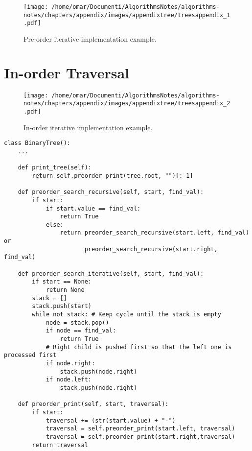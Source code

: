 \begin{figure}[H]
	\begin{center}
		\texttt{[image: /home/omar/Documenti/AlgorithmsNotes/algorithms-notes/chapters/appendix/images/appendixtree/treesappendix\_1.pdf]}
		\caption[Pre-order iterative implementation example.]{Pre-order iterative implementation example.}
		\label{appendixtrees_1}
	\end{center}
\end{figure}

\section{In-order Traversal}
\label{inorderappendix}
\begin{figure}[H]
	\begin{center}
		\texttt{[image: /home/omar/Documenti/AlgorithmsNotes/algorithms-notes/chapters/appendix/images/appendixtree/treesappendix\_2.pdf]}
		\caption[In-order iterative implementation example.]{In-order iterative implementation example.}
		\label{appendixtrees_2}
	\end{center}
\end{figure}

\begin{lstlisting}[firstnumber=1, caption={Tree operations implementation.}]
class BinaryTree():
	...

	def print_tree(self):
		return self.preorder_print(tree.root, "")[:-1]

	def preorder_search_recursive(self, start, find_val):
		if start:
			if start.value == find_val:
				return True
			else:
				return preorder_search_recursive(start.left, find_val) or
					   preorder_search_recursive(start.right, find_val)

	def preorder_search_iterative(self, start, find_val):
		if start == None:
			return None
		stack = []
		stack.push(start)
		while not stack: # Keep cycle until the stack is empty
			node = stack.pop()
			if node == find_val:
				return True
			# Right child is pushed first so that the left one is processed first
			if node.right:
				stack.push(node.right)
			if node.left:
				stack.push(node.right)

	def preorder_print(self, start, traversal):
		if start:
			traversal += (str(start.value) + "-")
			traversal = self.preorder_print(start.left, traversal)
			traversal = self.preorder_print(start.right,traversal)
		return traversal
\end{lstlisting}

